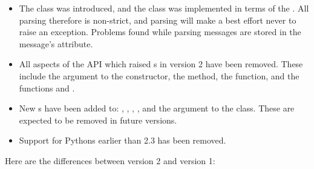 \begin{itemize}
\item The  class was introduced, and the 
      class was implemented in terms of the .  All parsing
      therefore is non-strict, and parsing will make a best effort never to
      raise an exception.  Problems found while parsing messages are stored in
      the message's  attribute.

\item All aspects of the API which raised s in
      version 2 have been removed.  These include the  argument
      to the  constructor, the 
      method, the  function, and the
      functions  and .

\item New s have been added to:
      , ,
      , , and
      the  argument to the  class.  These are
      expected to be removed in future versions.

\item Support for Pythons earlier than 2.3 has been removed.
\end{itemize}

Here are the differences between  version 2 and version 1:

